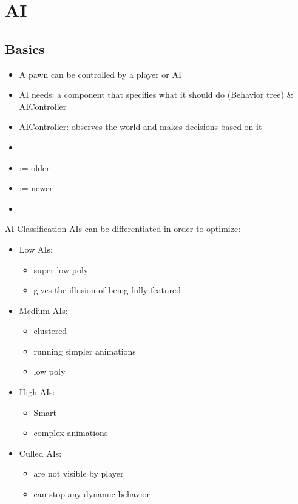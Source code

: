 \chapter{AI}%
    \section{Basics}
        \begin{itemize}
            \item A pawn can be controlled by a player or AI
            \item AI needs: a component that specifies what it should do (Behavior tree) \& AIController
            \item AIController: observes the world and makes decisions based on it
            \item 
            \item {} := older
            \item {} := newer
            \item
        \end{itemize}

        \uline{AI-Classification}
            AIs can be differentiated in order to optimize:
            \begin{itemize}
                \item Low AIs:
                \begin{itemize}
                    \item super low poly
                    \item gives the illusion of being fully featured
                \end{itemize}
                \item Medium AIs:
                \begin{itemize}
                    \item clustered
                    \item running simpler animations
                    \item low poly
                \end{itemize}
                \item High AIs:
                \begin{itemize}
                    \item Smart
                    \item complex animations
                \end{itemize}
                \item Culled AIs:
                \begin{itemize}
                    \item are not visible by player
                    \item can stop any dynamic behavior
                \end{itemize}

            \end{itemize}

